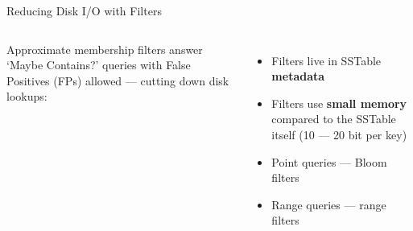 \begin{frame}{Reducing Disk I/O with Filters}
  \begin{columns}[T,onlytextwidth]
    Approximate membership filters answer `Maybe Contains?' queries with False Positives (FPs) allowed --- cutting down disk lookups:
    \begin{itemize}
      \item Filters live in SSTable \textbf{metadata}
      \item Filters use \textbf{small memory} compared to the SSTable itself (10 --- 20 bit per key)
      \item Point queries --- Bloom filters
      \item Range queries --- range filters
    \end{itemize}

    \centering
    \LSMfilterstrue
    \scalebox{0.95}{\LSMtree}
  \end{columns}
\end{frame}
